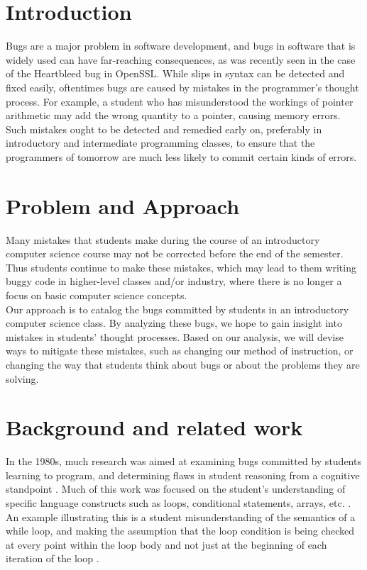 \documentclass{sig-alternate}
\begin{document}
\section{Introduction}
\label{sec:intro}

Bugs are a major problem in software development, and bugs in software that is widely used can have far-reaching consequences, as was recently seen in the case of the Heartbleed bug in OpenSSL. While slips in syntax can be detected and fixed easily, oftentimes bugs are caused by mistakes in the programmer's thought process. For example, a student who has misunderstood the workings of pointer arithmetic may add the wrong quantity to a pointer, causing memory errors. Such mistakes ought to be detected and remedied early on, preferably in introductory and intermediate programming classes, to ensure that the programmers of tomorrow are much less likely to commit certain kinds of errors.

\section{Problem and Approach}
Many mistakes that students make during the course of an introductory computer science course may not be corrected before the end of the semester. Thus students continue to make these mistakes, which may lead to them writing buggy code in higher-level classes and/or industry, where there is no longer a focus on basic computer science concepts.\\

Our approach is to catalog the bugs committed by students in an introductory computer science class. By analyzing these bugs, we hope to gain insight into mistakes in students' thought processes. Based on our analysis, we will devise ways to mitigate these mistakes, such as changing our method of instruction, or changing the way that students think about bugs or about the problems they are solving.

\section{Background and related work}
\label{sec:background}

In the 1980s, much research was aimed at examining bugs committed by students learning to program, and determining flaws in student reasoning from a cognitive standpoint \cite{JoniSolowayGoldmanEhrlich83, PutnamSleemanBaxterKuspa86, SpohrerSoloway86, Pea86}. Much of this work was focused on the student's understanding of specific language constructs such as loops, conditional statements, arrays, etc. \cite{JoniSolowayGoldmanEhrlich83, PutnamSleemanBaxterKuspa86, Pea86}. An example illustrating this is a student misunderstanding of the semantics of a while loop, and making the assumption that the loop condition is being checked at every point within the loop body and not just at the beginning of each iteration of the loop \cite{Pea86}.\\
\end{document}
